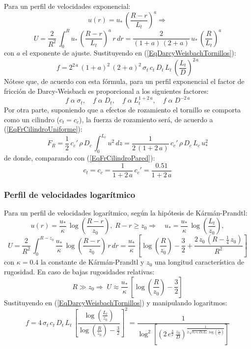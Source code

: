 \documentclass[a4paper]{article}
\newcommand{\EQ}[2]{\begin{equation}#1\label{#2}\end{equation}}
\begin{document}
Para un perfil de velocidades exponencial:
\[u(r)=u_*\,\left(\frac{R-r}{L_t}\right)^a\Rightarrow\]
\EQ
{
  U=\frac2{R^2}\,\int_0^Ru_*\,\left(\frac{R-r}{L_t}\right)^a\,r\,dr
  =\frac2{(1+a)\,(2+a)}\,u_*\,\left(\frac{R}{L_t}\right)^a
}{EqUExponencial}
con $a$ el exponente de ajuste. Sustituyendo en
(\ref{EqDarcyWeisbachTornillos}):
\EQ
{
  f=2^{2\,a}\,(1+a)^2\,(2+a)^2\,\sigma_t\,c_t\,D_t\,L_t
  \,\left(\frac{L_t}{D}\right)^{2\,a}
}{EqfExponencial}
Nótese que, de acuerdo con esta fórmula, para un perfil exponencial el factor de
fricción de Darcy-Weisbach es proporcional a los siguientes factores:
\EQ
{
  f\;\alpha\;\sigma_t,\quad
  f\;\alpha\;D_t,\quad
  f\;\alpha\;L_t^{1+2\,a},\quad
  f\;\alpha\;D^{-2\,a}
}{EqfExponencialFactores}
Por otra parte, suponiendo que a efectos de rozamiento el tornillo se comporta
como un cilindro ($c_t=c_c$), la fuerza de rozamiento será, de acuerdo a
(\ref{EqFrCilindroUniforme}):
\EQ
{
	F_R=\frac12\,c_c'\,\rho\,D_c\,\int_0^{L_c}u^2\,dz
	=\frac1{2\,(1+2\,a)}\,c_c'\,\rho\,D_c\,L_c\,u_*^2
}{EqFrExponencial}
de donde, comparando con (\ref{EqFrCilindroPared}):
\EQ
{
	c_t=c_c=\frac1{1+2\,a}\,c_c'=\frac{0.51}{1+2\,a}
}{EqCcExponencial}

\subsubsection{Perfil de velocidades logarítmico}

Para un perfil de velocidades logarítmico, según la hipótesis de Kármán-Prandtl:
\[
  u(r)=\frac{u_*}{\kappa}
  \,\log\left(\frac{R-r}{z_0}\right),\;R-r\geq z_0\Rightarrow\quad
  u_*=\frac{u_*}{\kappa}\,\log\left(\frac{L_t}{z_0}\right),\]
\EQ
{
  U=\frac2{R^2}\,\int_0^{R-z_0}
  \frac{u_*}{\kappa}\,\log\left(\frac{R-r}{z_0}\right)\,r\,dr
  =\frac{u_*}{\kappa}\,\left[\log\left(\frac{R}{z_0}\right)-\frac32
  +\frac{2\,z_0\,\left(R-\frac14\,z_0\right)}{R^2}\right]
}{EqULogaritmico}
con $\kappa=0.4$ la constante de Kármán-Prandtl y $z_0$ una longitud
característica de rugosidad. En caso de bajas rugosidades relativas:
\EQ
{
  R\gg z_0\Rightarrow\;
  U\approx\frac{u_*}{\kappa}
  \,\left[\log\left(\frac{R}{z_0}\right)-\frac32\right]
}{EqULogaritmicoAproximado}
Sustituyendo en (\ref{EqDarcyWeisbachTornillos}) y manipulando logaritmos:
\EQ
{
  f=4\,\sigma_t\,c_t\,D_t\,L_t\,\left[\frac{\log\left(\frac{L_t}{z_0}\right)}
  {\log\left(\frac{R}{z_0}\right)-\frac32}\right]^2
  =\frac1{\log^2\left[\left(2\,e^{\frac32}\,\frac{z_0}{D}\right)^{\frac1{2\,
  \sqrt{\sigma_t\,c_t\,D_t\,L_t}\,\log\left(\frac{z_0}{L_t}\right)}}\right]}
}{EqfLogaritmico}
\end{document}
